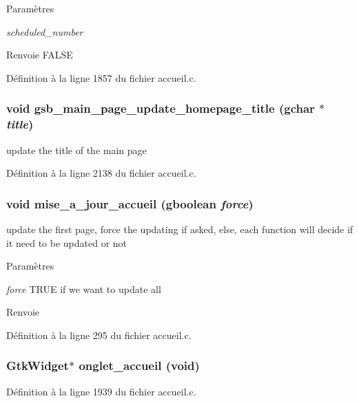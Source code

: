 \begin{DoxyParams}{Paramètres}
\item[{\em scheduled\_\-number}]\end{DoxyParams}
\begin{DoxyReturn}{Renvoie}
FALSE 
\end{DoxyReturn}


Définition à la ligne 1857 du fichier accueil.c.

\subsubsection[{gsb\_\-main\_\-page\_\-update\_\-homepage\_\-title}]{\setlength{\rightskip}{0pt plus 5cm}void gsb\_\-main\_\-page\_\-update\_\-homepage\_\-title (gchar $\ast$ {\em title})}\label{accueil_8h_a464c456279ac03bc59b1f54ae2133bf1}
update the title of the main page 

Définition à la ligne 2138 du fichier accueil.c.

\subsubsection[{mise\_\-a\_\-jour\_\-accueil}]{\setlength{\rightskip}{0pt plus 5cm}void mise\_\-a\_\-jour\_\-accueil (gboolean {\em force})}\label{accueil_8h_a15511226739a34542ef8d7b979aedcf0}
update the first page, force the updating if asked, else, each function will decide if it need to be updated or not


\begin{DoxyParams}{Paramètres}
\item[{\em force}]TRUE if we want to update all\end{DoxyParams}
\begin{DoxyReturn}{Renvoie}

\end{DoxyReturn}


Définition à la ligne 295 du fichier accueil.c.

\subsubsection[{onglet\_\-accueil}]{\setlength{\rightskip}{0pt plus 5cm}GtkWidget$\ast$ onglet\_\-accueil (void)}\label{accueil_8h_a2ce3fbe764b92fba9b115271c89ddbb1}


Définition à la ligne 1939 du fichier accueil.c.

